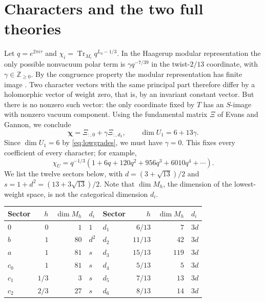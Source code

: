 \documentclass[11pt,a4paper]{article}
\DeclareMathOperator{\Tr}{Tr}
\newcommand{\ZZ}{\mathbb Z}
\begin{document}
\section{Characters and the two full theories}\label{sec:characters}
Let $q=e^{2\pi i\tau}$ and
$\chi_i=\Tr_{M_i}q^{L_0-1/3}$. In the Haagerup modular representation
the only possible nonvacuum polar term is
$\gamma q^{-7/39}$ in the twist-$2/13$ coordinate, with
$\gamma\in\ZZ_{\ge0}$. By the congruence property the modular
representation has finite image \cite{DLN}. Two character vectors with
the same principal part therefore differ by a holomorphic vector of
weight zero, that is, by an invariant constant vector. But there is no
nonzero such vector: the only coordinate fixed by $T$ has an $S$-image
with nonzero vacuum component. Using the fundamental matrix $\Xi$ of
Evans and Gannon, we conclude
\begin{equation}\label{eq:gamma}
 \boldsymbol\chi=\Xi_{:,0}+\gamma\Xi_{:,d_3},\qquad
 \dim U_1=6+13\gamma.
\end{equation}
Since $\dim U_1=6$ by \eqref{eq:lowgrades}, we must have $\gamma=0$.
This fixes every coefficient of every character; for example,
\begin{equation}\label{eq:vacchar}
 \chi_U=q^{-1/3}(1+6q+120q^2+956q^3+6010q^4+\cdots).
\end{equation}
We list the twelve sectors below, with $d=(3+\sqrt{13})/2$ and
$s=1+d^2=(13+3\sqrt{13})/2$. Note that $\dim M_h$, the dimension of
the lowest-weight space, is not the categorical dimension $d_i$.
\begin{center}
\begin{tabular}{@{}lrrl@{\qquad}lrrl@{}}
\toprule
Sector&$h$&$\dim M_h$&$d_i$&Sector&$h$&$\dim M_h$&$d_i$\\
\midrule
$0$&$0$&$1$&$1$&$d_1$&$6/13$&$7$&$3d$\\
$b$&$1$&$80$&$d^2$&$d_2$&$11/13$&$42$&$3d$\\
$a$&$1$&$81$&$s$&$d_3$&$15/13$&$119$&$3d$\\
$c_0$&$1$&$81$&$s$&$d_4$&$5/13$&$5$&$3d$\\
$c_1$&$1/3$&$3$&$s$&$d_5$&$7/13$&$13$&$3d$\\
$c_2$&$2/3$&$27$&$s$&$d_6$&$8/13$&$14$&$3d$\\
\bottomrule
\end{tabular}
\end{center}
\end{document}
